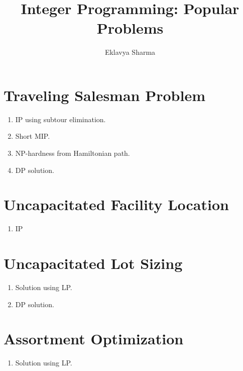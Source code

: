 \documentclass[a4paper,12pt,fleqn]{article}
\author{Eklavya Sharma}
\date{\empty}
\title{Integer Programming: Popular Problems}
\begin{document}
\maketitle
\setlength{\parskip}{0.2em}

\section{Traveling Salesman Problem}

\begin{enumerate}
\item IP using subtour elimination.
\item Short MIP.
\item NP-hardness from Hamiltonian path.
\item DP solution.
\end{enumerate}

\section{Uncapacitated Facility Location}

\begin{enumerate}
\item IP
\end{enumerate}

\section{Uncapacitated Lot Sizing}

\begin{enumerate}
\item Solution using LP.
\item DP solution.
\end{enumerate}

\section{Assortment Optimization}

\begin{enumerate}
\item Solution using LP.
\end{enumerate}
\end{document}
